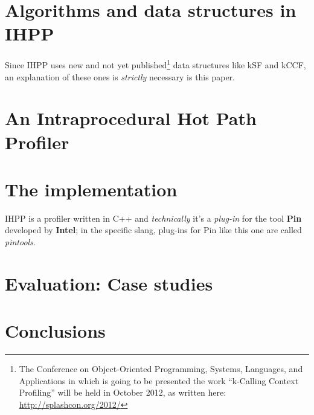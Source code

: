 \documentclass[a4paper,11pt]{report}
\begin{document}
\chapter{Algorithms and data structures in IHPP}

Since IHPP uses new and not yet published\footnote{The Conference on Object-Oriented Programming, Systems, Languages, and Applications in which is going to be presented the work ``k-Calling Context Profiling'' will be held in October 2012, as written here: \url{http://splashcon.org/2012/}} data structures like kSF and kCCF, an explanation of these ones is \emph{strictly} necessary is this paper.

\chapter{An Intraprocedural Hot Path Profiler}

\chapter{The implementation}

IHPP is a profiler written in C++ and \emph{technically} it's a \emph{plug-in} for the tool \textbf{Pin} developed by \textbf{Intel}; in the specific slang, plug-ins for Pin like this one are called \emph{pintools}.

\chapter{Evaluation: Case studies}


\chapter{Conclusions}
\end{document}
